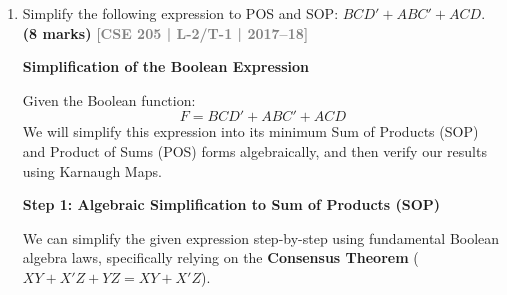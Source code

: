 \documentclass[12pt,a3paper]{article}
\newcommand{\yr}[1]{\hfill\textcolor{gray}{\small\textbf{[#1]}}}
\newcommand{\mk}[1]{\textcolor{orange!70!black}{\small\textbf{(#1 marks)}}}
\begin{document}
\begin{enumerate}
\begin{tcolorbox}[enhanced,breakable,ansbox,colback=cA!4,colframe=cA,boxrule=0.8pt,arc=5pt,title={\textbf{Answer}},fonttitle=\bfseries\color{white},colbacktitle=cA]
\begin{itemize}
    \item \textbf{POS Extraction:} By grouping the $0$s, we extract the maxterms. Recall that for maxterms, logic is inverted ($0 \to$ uncomplemented, $1 \to$ complemented).
    \begin{itemize}
        \item \textcolor{magenta}{\textbf{Magenta 2x2 Square:}} Constant $A=0, C=1 \implies (A + C')$
        \item \textcolor{orange}{\textbf{Orange Edges (Top Corners):}} Constant $A=0, D=0 \implies (A + D)$
        \item \textcolor{cyan}{\textbf{Cyan 1x2 Rectangle:}} Constant $B=1, C=0, D=0 \implies (B' + C + D)$
    \end{itemize}
    Multiplying these groups confirms $\mathbf{F_{POS} = (A + C')(A + D)(B' + C + D)}$.
\end{itemize}

\end{tcolorbox}

\item Simplify the following expression to POS and SOP: $BCD' + ABC' + ACD$.
\mk{8} \yr{CSE 205 | L-2/T-1 | 2017--18}

\begin{tcolorbox}[enhanced,breakable,ansbox,colback=cA!4,colframe=cA,boxrule=0.8pt,arc=5pt,title={\textbf{Answer}},fonttitle=\bfseries\color{white},colbacktitle=cA]

\textbf{Simplification of the Boolean Expression}

Given the Boolean function:
\[ F = BCD' + ABC' + ACD \]
We will simplify this expression into its minimum Sum of Products (SOP) and Product of Sums (POS) forms algebraically, and then verify our results using Karnaugh Maps.

\vspace{0.3cm}
\textbf{Step 1: Algebraic Simplification to Sum of Products (SOP)}

We can simplify the given expression step-by-step using fundamental Boolean algebra laws, specifically relying on the \textbf{Consensus Theorem} ($XY + X'Z + YZ = XY + X'Z$). 


\end{tcolorbox}
\end{enumerate}
\end{document}
